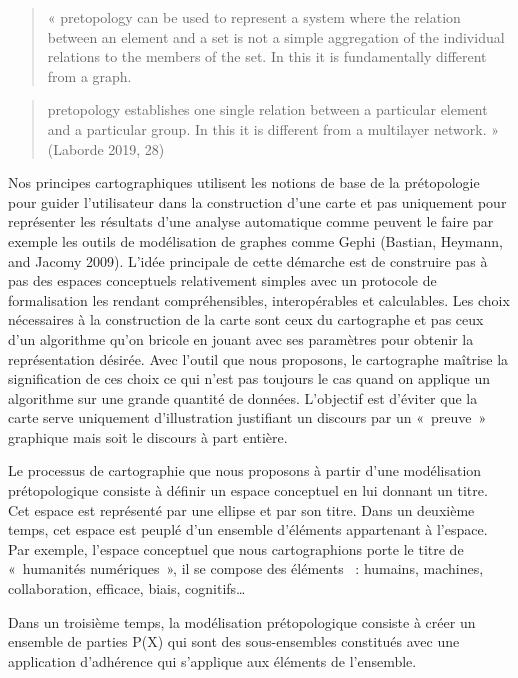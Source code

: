 \documentclass[
  letterpaper,
  DIV=11,
  numbers=noendperiod]{scrreprt}
\begin{document}
\begin{quote}
« pretopology can be used to represent a system where the relation
between an element and a set is not a simple aggregation of the
individual relations to the members of the set. In this it is
fundamentally different from a graph.
\end{quote}

\begin{quote}
pretopology establishes one single relation between a particular element
and a particular group. In this it is different from a multilayer
network. » (Laborde 2019, 28)
\end{quote}

Nos principes cartographiques utilisent les notions de base de la
prétopologie pour guider l'utilisateur dans la construction d'une carte
et pas uniquement pour représenter les résultats d'une analyse
automatique comme peuvent le faire par exemple les outils de
modélisation de graphes comme Gephi (Bastian, Heymann, and Jacomy 2009).
L'idée principale de cette démarche est de construire pas à pas des
espaces conceptuels relativement simples avec un protocole de
formalisation les rendant compréhensibles, interopérables et
calculables. Les choix nécessaires à la construction de la carte sont
ceux du cartographe et pas ceux d'un algorithme qu'on bricole en jouant
avec ses paramètres pour obtenir la représentation désirée. Avec l'outil
que nous proposons, le cartographe maîtrise la signification de ces
choix ce qui n'est pas toujours le cas quand on applique un algorithme
sur une grande quantité de données. L'objectif est d'éviter que la carte
serve uniquement d'illustration justifiant un discours par un «~preuve~»
graphique mais soit le discours à part entière.

Le processus de cartographie que nous proposons à partir d'une
modélisation prétopologique consiste à définir un espace conceptuel en
lui donnant un titre. Cet espace est représenté par une ellipse et par
son titre. Dans un deuxième temps, cet espace est peuplé d'un ensemble
d'éléments appartenant à l'espace. Par exemple, l'espace conceptuel que
nous cartographions porte le titre de «~humanités numériques~», il se
compose des éléments ~: humains, machines, collaboration, efficace,
biais, cognitifs\ldots{}

Dans un troisième temps, la modélisation prétopologique consiste à créer
un ensemble de parties P(X) qui sont des sous-ensembles constitués avec
une application d'adhérence qui s'applique aux éléments de l'ensemble.
\end{document}

